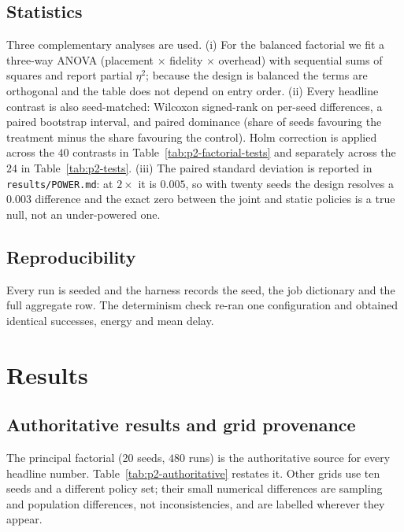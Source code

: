 \documentclass[journal,10pt]{IEEEtran}
\begin{document}
\subsection{Statistics}
Three complementary analyses are used. (i) For the balanced factorial we fit a
three-way ANOVA (placement $\times$ fidelity $\times$ overhead) with sequential
sums of squares and report partial $\eta^2$; because the design is balanced the
terms are orthogonal and the table does not depend on entry order. (ii) Every
headline contrast is also seed-matched: Wilcoxon signed-rank on per-seed
differences, a paired bootstrap interval, and paired dominance (share of seeds
favouring the treatment minus the share favouring the control). Holm correction
is applied across the $40$ contrasts in Table~\ref{tab:p2-factorial-tests} and
separately across the $24$ in Table~\ref{tab:p2-tests}. (iii) The paired
standard deviation is reported in \texttt{results/POWER.md}: at $2\times$ it is
$0.005$, so with twenty seeds the design resolves a $0.003$ difference and the
exact zero between the joint and static policies is a true null, not an
under-powered one.

\subsection{Reproducibility}
Every run is seeded and the harness records the seed, the job dictionary and the
full aggregate row. The determinism check re-ran one configuration and obtained
identical successes, energy and mean delay.

\section{Results}
\label{sec:res}

\subsection{Authoritative results and grid provenance}
The principal factorial (20 seeds, $480$ runs) is the authoritative source for
every headline number. Table~\ref{tab:p2-authoritative} restates it. Other grids
use ten seeds and a different policy set; their small numerical differences are
sampling and population differences, not inconsistencies, and are labelled
wherever they appear.
\end{document}
